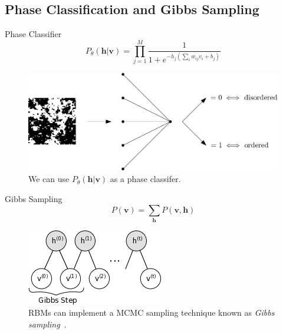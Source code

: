 \documentclass{beamer}
\newcommand{\bolds}[1]{\boldsymbol{#1}}
\newcommand{\bh}{\bolds{h}}
\newcommand{\bv}{\bolds{v}}
\begin{document}
\subsection{Phase Classification and Gibbs Sampling}
\begin{frame}{Phase Classifier}
  \begin{equation*}
    \boxed{P_\theta(\bh|\bv)=\prod_{j=1}^M \frac{1}{1+e^{-h_j(\sum_i w_{ij} v_i +b_j )}}
    }\label{eq:v-to-h}
  \end{equation*}%
  \begin{figure}[ht]
    \centering
    \includegraphics[width=0.8\linewidth]{figures/classifier.png}
    \caption{We can use $P_\theta(\bh\rvert\bv)$ as a phase
      classifer.}
  \end{figure}


\end{frame}

\begin{frame}{Gibbs Sampling}
  \begin{equation*}%
    \boxed{P(\bv)=\sum_{\bh}P(\bv,\bh)}
  \end{equation*}%

  \begin{figure}[ht]
    \centering
    \includegraphics[width=0.5\linewidth]{figures/gibbs_steps.png}
    \caption{RBMs can implement a MCMC sampling technique known as
      \textit{Gibbs sampling}~\cite{gibbs-sampling}.}
  \end{figure}

\end{frame}

\end{document}
